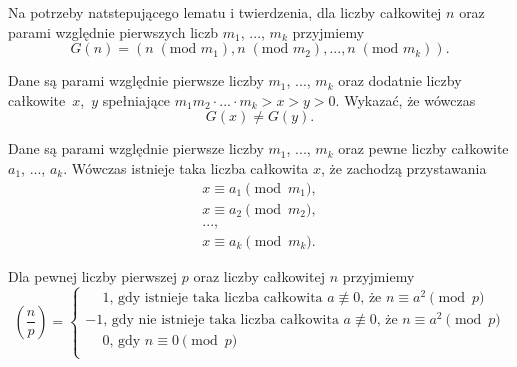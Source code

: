 


\noindent
Na potrzeby natstepującego lematu i twierdzenia, dla liczby całkowitej $n$ oraz parami względnie pierwszych liczb $m_1$, ..., $m_k$ przyjmiemy
\[
	G(n) = (n \;(\text{mod } m_1), n \;(\text{mod } m_2), ..., n \;(\text{mod } m_k)).
\]




\noindent
Dane są parami względnie pierwsze liczby $m_1$, ..., $m_k$ oraz dodatnie liczby całkowite~$x$,~$y$ spełniające $m_1m_2\cdot ... \cdot m_k > x > y > 0$. Wykazać, że wówczas
\[
	G(x) \neq G(y).
\]





\noindent
Dane są parami względnie pierwsze liczby $m_1$, ..., $m_k$ oraz pewne liczby całkowite $a_1$, ..., $a_k$. Wówczas istnieje taka liczba całkowita $x$, że zachodzą przystawania
\begin{gather*}
	x \equiv a_1 \pmod{m_1}, \\
	x \equiv a_2 \pmod{m_2}, \\
	..., \\
	x \equiv a_k \pmod{m_k}.
\end{gather*}




\noindent
Dla pewnej liczby pierwszej $p$ oraz liczby całkowitej $n$ przyjmiemy
\[
	\left(\frac{n}{p}\right) = 
	\begin{cases}
		\phantom{-}1 \text{, gdy istnieje taka liczba całkowita } a \not\equiv 0 \text{, że } n \equiv a^2 \pmod{p}\\
		-1\text{, gdy nie istnieje taka liczba całkowita } a \not\equiv 0 \text{, że } n \equiv a^2 \pmod{p} \\
		\phantom{-}0 \text{, gdy } n \equiv 0 \pmod{p}\\
	\end{cases}
\]

